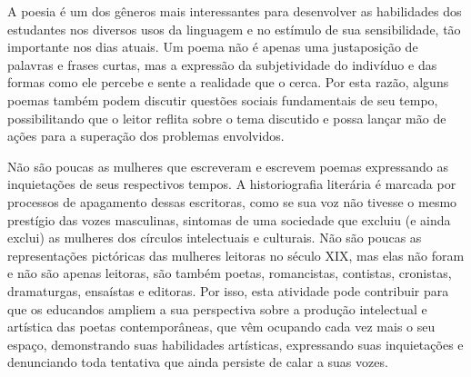 \documentclass[12pt]{extarticle}
\begin{document}
A poesia é um dos gêneros mais interessantes para desenvolver as
habilidades dos estudantes nos diversos usos da linguagem e no estímulo
de sua sensibilidade, tão importante nos dias atuais. Um poema não é
apenas uma justaposição de palavras e frases curtas, mas a expressão da
subjetividade do indivíduo e das formas como ele percebe e sente a
realidade que o cerca. Por esta razão, alguns poemas também podem
discutir questões sociais fundamentais de seu tempo, possibilitando que
o leitor reflita sobre o tema discutido e possa lançar mão de ações para
a superação dos problemas envolvidos.

Não são poucas as mulheres que escreveram e escrevem poemas expressando
as inquietações de seus respectivos tempos. A historiografia literária é
marcada por processos de apagamento dessas escritoras, como se sua voz
não tivesse o mesmo prestígio das vozes masculinas, sintomas de uma
sociedade que excluiu (e ainda exclui) as mulheres dos círculos
intelectuais e culturais. Não são poucas as representações pictóricas
das mulheres leitoras no século XIX, mas elas não foram e não são apenas
leitoras, são também poetas, romancistas, contistas, cronistas,
dramaturgas, ensaístas e editoras. Por isso, esta atividade pode
contribuir para que os educandos ampliem a sua perspectiva sobre a
produção intelectual e artística das poetas contemporâneas, que vêm
ocupando cada vez mais o seu espaço, demonstrando suas habilidades
artísticas, expressando suas inquietações e denunciando toda tentativa
que ainda persiste de calar a suas vozes.
\end{document}

